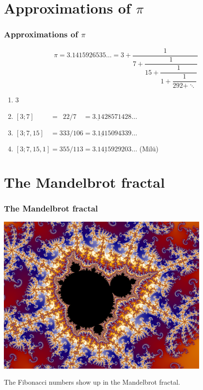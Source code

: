 \documentclass[12pt,compress,english,utf8,t]{beamer}
\newcommand{\icfracccc}[5]{#1 + \dfrac{1}{#2 + \dfrac{1}{#3 + \dfrac{1}{#4 + \dfrac{1}{#5 + \ddots}}}}}
\begin{document}


\section{\texorpdfstring{Approximations of $\pi$}{Approximations of π}}

\begin{frame}\frametitle{Approximations of $\pi$}
  \[ \pi = 3.1415926535\ldots = \icfracccc{3}{7}{15}{1}{292} \]

  \begin{enumerate}
    \item $3$
    \item $[3;7]\phantom{,15,1} = \phantom{0}22/7\phantom{00} = \underline{3.14}28571428\ldots$
    \item $[3;7,15]\phantom{,1} = 333/106 = \underline{3.1415}094339\ldots$
    \item $[3;7,15,1] = 355/113 = \underline{3.141592}9203\ldots$ (Milü)
  \end{enumerate}
\end{frame}


\section{The Mandelbrot fractal}

\begin{frame}\frametitle{The Mandelbrot fractal}
  \centering
  \includegraphics[width=0.8\textwidth]{mandelbrot}
  \medskip
  \pause

  The Fibonacci numbers show up in the Mandelbrot fractal.
  \par
\end{frame}
\end{document}

